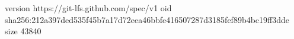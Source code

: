 version https://git-lfs.github.com/spec/v1
oid sha256:212a397ded535f45b7a17d72eea46bbfe416507287d3185fef89b4bc19ff3dde
size 43840
